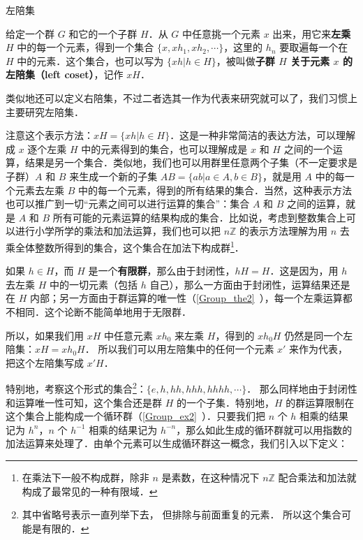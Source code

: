 

\begin{definition}{左陪集}

给定一个群 $G$ 和它的一个子群 $H$．从 $G$ 中任意挑一个元素 $x$ 出来，用它来\textbf{左乘} $H$ 中的每一个元素，得到一个集合 $\{x, xh_1, xh_2, \cdots\}$，这里的 $h_n$ 要取遍每一个在 $H$ 中的元素．这个集合，也可以写为 $\{xh|h\in H\}$，被叫做\textbf{子群 $H$ 关于元素 $x$ 的左陪集（left coset）}，记作 $xH$． 

\end{definition}

类似地还可以定义右陪集，不过二者选其一作为代表来研究就可以了，我们习惯上主要研究左陪集．

注意这个表示方法：$xH=\{xh|h\in H\}$．这是一种非常简洁的表达方法，可以理解成 $x$ 逐个左乘 $H$ 中的元素得到的集合，也可以理解成是 $x$ 和 $H$ 之间的一个运算，结果是另一个集合．类似地，我们也可以用群里任意两个子集（不一定要求是子群）$A$ 和 $B$ 来生成一个新的子集 $AB=\{ab|a\in A, b\in B\}$，就是用 $A$ 中的每一个元素去左乘 $B$ 中的每一个元素，得到的所有结果的集合．当然，这种表示方法也可以推广到一切“元素之间可以进行运算的集合”：集合 $A$ 和 $B$ 之间的运算，就是 $A$ 和 $B$ 所有可能的元素运算的结果构成的集合．比如说，考虑到整数集合上可以进行小学所学的乘法和加法运算，我们也可以把 $n\mathbb{Z}$ 的表示方法理解为用 $n$ 去乘全体整数所得到的集合，这个集合在加法下构成群\footnote{在乘法下一般不构成群，除非 $n$ 是素数，在这种情况下 $n\mathbb{Z}$ 配合乘法和加法就构成了最常见的一种有限域．}．

如果 $h\in H$，而 $H$ 是一个\textbf{有限群}，那么由于封闭性，$hH=H$．这是因为，用 $h$ 去左乘 $H$ 中的一切元素（包括 $h$ 自己），那么一方面由于封闭性，运算结果还是在 $H$ 内部；另一方面由于群运算的唯一性（\autoref{Group_the2}~），每一个左乘运算都不相同．这个论断不能简单地用于无限群．

所以，如果我们用 $xH$ 中任意元素 $xh_0$ 来左乘 $H$，得到的 $xh_0H$ 仍然是同一个左陪集：$xH=xh_0H$． 所以我们可以用左陪集中的任何一个元素 $x'$ 来作为代表，把这个左陪集写成 $x'H$．

特别地，考察这个形式的集合\footnote{其中省略号表示一直列举下去， 但排除与前面重复的元素． 所以这个集合可能是有限的．}：$\{e, h, hh, hhh, hhhh, \cdots\}$． 那么同样地由于封闭性和运算唯一性可知，这个集合还是群 $H$ 的一个子集．特别地，$H$ 的群运算限制在这个集合上能构成一个循环群（\autoref{Group_ex2}~）．只要我们把 $n$ 个 $h$ 相乘的结果记为 $h^n$，$n$ 个 $h^{-1}$ 相乘的结果记为 $h^{-n}$，那么如此生成的循环群就可以用指数的加法运算来处理了．由单个元素可以生成循环群这一概念，我们引入以下定义：


